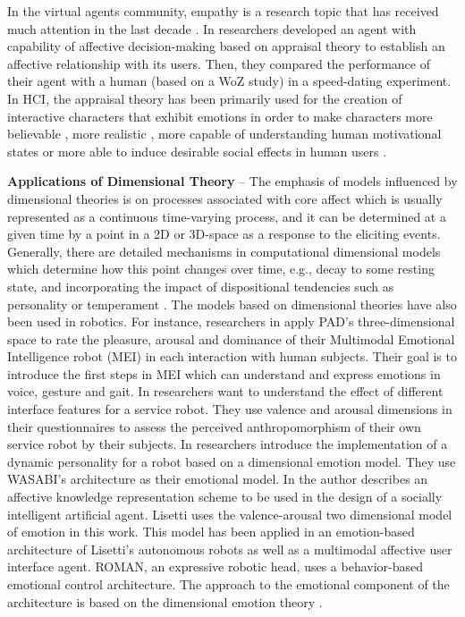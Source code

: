 \documentclass[12pt]{report}
\begin{document}
In the virtual agents community, empathy is a research topic that has received
much attention in the last decade \cite{brave:emotion-hci}
\cite{scott:modeling-empathy-agent} \cite{paiva:agent-care}
\cite{prendinger:empathic-companion} \cite{bickmore:longterm-relationship}. In
\cite{pontier:women-robot-men} researchers developed an agent with capability of
affective decision-making based on appraisal theory to establish an affective
relationship with its users. Then, they compared the performance of their agent
with a human (based on a WoZ study) in a speed-dating experiment. In HCI, the
appraisal theory has been primarily used for the creation of interactive
characters that exhibit emotions in order to make characters more believable
\cite{neal:believable-agents}, more realistic \cite{mao:social-causality}
\cite{traum:negotiation-teams-training}, more capable of understanding human
motivational states \cite{conati:evaluating-student-affect} or more able to
induce desirable social effects in human users \cite{paiva:learning-feeling}.

\textbf{Applications of Dimensional Theory} -- The emphasis of models influenced
by dimensional theories is on processes associated with core affect which is
usually represented as a continuous time-varying process, and it can be
determined at a given time by a point in a 2D or 3D-space as a response to the
eliciting events. Generally, there are detailed mechanisms in computational
dimensional models which determine how this point changes over time, e.g., decay
to some resting state, and incorporating the impact of dispositional tendencies
such as personality or temperament \cite{gebhard:alma}
\cite{marsella:computational-models}. The models based on dimensional theories
have also been used in robotics. For instance, researchers in
\cite{lim:mei-motherese-ei} apply PAD's three-dimensional space to rate the
pleasure, arousal and dominance of their Multimodal Emotional Intelligence robot
(MEI) in each interaction with human subjects. Their goal is to introduce the
first steps in MEI which can understand and express emotions in voice, gesture
and gait. In \cite{zhang:service-robot-dimensional} researchers want to
understand the effect of different interface features for a service robot. They
use valence and arousal dimensions in their questionnaires to assess the
perceived anthropomorphism of their own service robot by their subjects. In
\cite{klug:emotion-based-hri} researchers introduce the implementation of a
dynamic personality for a robot based on a dimensional emotion model. They use
WASABI's architecture \cite{becker:wasabi,becker:wasabi-description} as their
emotional model. In \cite{lisetti:affect-socially-intelligent} the author
describes an affective knowledge representation scheme to be used in the design
of a socially intelligent artificial agent. Lisetti uses the valence-arousal two
dimensional model of emotion in this work. This model has been applied in an
emotion-based architecture of Lisetti's autonomous robots as well as a
multimodal affective user interface agent. ROMAN, an expressive robotic head,
uses a behavior-based emotional control architecture. The approach to the
emotional component of the architecture is based on the dimensional emotion
theory \cite{hirth:roman}.
\end{document}
